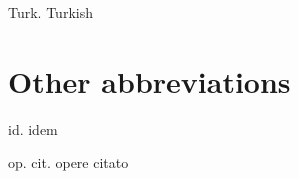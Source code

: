 \begin{refsection}
\begin{multicols}{2}
	Turk.	Turkish

	
%	
%	
%	
%	
%	
%	
%	
%	
%	
%	
%	
%	
%	
%	
%	
%	
%	
%	
%	
%	
%	
%	
%	
%	
%	
	

\end{multicols}


\section*{Other abbreviations}
\begin{multicols}{2}\setlength{\parindent}{0pt}
	
		id. idem
	
		{op. cit.} opere citato
	
\end{multicols}

\printbibliography[heading=subbibliography]
\end{refsection}

\setlength{\parindent}{10pt}